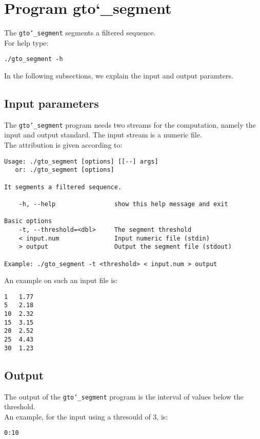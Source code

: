 \section{Program gto\char`_segment}
The \texttt{gto\char`_segment} segments a filtered sequence.\\
For help type:
\begin{lstlisting}
./gto_segment -h
\end{lstlisting}
In the following subsections, we explain the input and output paramters.

\subsection*{Input parameters}

The \texttt{gto\char`_segment} program needs two streams for the computation, namely the input and output standard. The input stream is a numeric file.\\
The attribution is given according to:
\begin{lstlisting}
Usage: ./gto_segment [options] [[--] args]
   or: ./gto_segment [options]

It segments a filtered sequence.

    -h, --help                show this help message and exit

Basic options
    -t, --threshold=<dbl>     The segment threshold
    < input.num               Input numeric file (stdin)
    > output                  Output the segment file (stdout)

Example: ./gto_segment -t <threshold> < input.num > output
\end{lstlisting}
An example on such an input file is:
\begin{lstlisting}
1   1.77
5   2.18
10  2.32
15  3.15
20  2.52
25  4.43
30  1.23
\end{lstlisting}

\subsection*{Output}
The output of the \texttt{gto\char`_segment} program is the interval of values ​​below the threshold.\\
An example, for the input using a thresould of 3, is:
\begin{lstlisting}
0:10
\end{lstlisting}